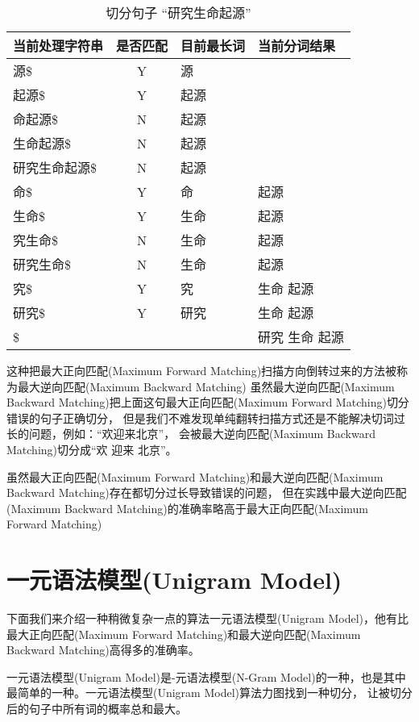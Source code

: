 \documentclass[12pt,a4paper]{article}
\def\maxforward{{\cn 最大正向匹配{\en(Maximum Forward Matching)}}}
\def\maxbackward{{\cn 最大逆向匹配{\en(Maximum Backward Matching)}}}
\def\NGram{{\cn {\en N}-元语法模型{\en(N-Gram Model)}}}
\def\UniGram{{\cn 一元语法模型{\en(Unigram Model)}}}
\begin{document}
\begin{table}
\caption{切分句子 “研究生命起源”}
\label{tbl_maxbackward}
	\begin{center}
		\begin{tabular}{l|c|l|l}
			当前处理字符串           & 是否匹配 & 目前最长词 & 当前分词结果   \\
			\hline
			源\$                     & {\en Y}  & 源         &                \\
			起源\$                   & {\en Y}  & 起源       &                \\
			命起源\$                 & {\en N}  & 起源       &                \\
			生命起源\$               & {\en N}  & 起源       &                \\
			研究生命起源\$           & {\en N}  & 起源       &                \\

			命\$                     & {\en Y}  & 命         & 起源           \\
			生命\$                   & {\en Y}  & 生命       & 起源           \\
			究生命\$                 & {\en N}  & 生命       & 起源           \\
			研究生命\$               & {\en N}  & 生命       & 起源           \\

			究\$                     & {\en Y}  & 究         & 生命 起源      \\
			研究\$                   & {\en Y}  & 研究       & 生命 起源      \\

			\$                       &          &            & 研究 生命 起源 \\
		\end{tabular}
	\end{center}
\end{table}

这种把\maxforward 扫描方向倒转过来的方法被称为\maxbackward
虽然\maxbackward 把上面这句\maxforward 切分错误的句子正确切分，
但是我们不难发现单纯翻转扫描方式还是不能解决切词过长的问题，例如：“欢迎来北京”，
会被\maxbackward 切分成“欢 迎来 北京”。

虽然\maxforward 和\maxbackward 存在都切分过长导致错误的问题，
但在实践中\maxbackward 的准确率略高于\maxforward

\section{\UniGram}

下面我们来介绍一种稍微复杂一点的算法\UniGram，他有比\maxforward 和\maxbackward 高得多的准确率。

\UniGram 是\NGram 的一种，也是其中最简单的一种。\UniGram 算法力图找到一种切分，
让被切分后的句子中所有词的概率总和最大。
\end{document}
